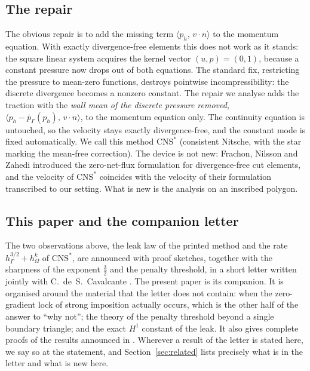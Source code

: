 \documentclass[pdflatex,sn-mathphys-num]{sn-jnl}
\theoremstyle{thmstyleone}
\theoremstyle{thmstylethree}
\newcommand{\hG}{h_\Gamma}
\newcommand{\hO}{h_\Omega}
\newcommand{\pbG}{\bar p_{\Gamma}}
\newcommand{\ip}[2]{\langle #1,\, #2\rangle}
\newcommand{\CNS}{\mathrm{CNS}^\ast}
\begin{document}
\subsection{The repair}
The obvious repair is to add the missing term $\ip{p_h}{v\cdot n}$ to the momentum equation. With exactly divergence-free elements this does not work as it stands: the square linear system acquires the kernel vector $(u,p)=(0,1)$, because a constant pressure now drops out of both equations. The standard fix, restricting the pressure to mean-zero functions, destroys pointwise incompressibility: the discrete divergence becomes a nonzero constant. The repair we analyse adds the traction with the \emph{wall mean of the discrete pressure removed}, $\ip{p_h-\pbG(p_h)}{v\cdot n}$, to the momentum equation only. The continuity equation is untouched, so the velocity stays exactly divergence-free, and the constant mode is fixed automatically. We call this method $\CNS$ (consistent Nitsche, with the star marking the mean-free correction). The device is not new: Frachon, Nilsson and Zahedi \cite{FrachonNilssonZahedi2024} introduced the zero-net-flux formulation for divergence-free cut elements, and the velocity of $\CNS$ coincides with the velocity of their formulation transcribed to our setting. What is new is the analysis on an inscribed polygon.

\subsection{This paper and the companion letter}\label{sec:companion}
The two observations above, the leak law of the printed method and the rate $\hG^{3/2}+\hO^k$ of $\CNS$, are announced with proof sketches, together with the sharpness of the exponent $\frac32$ and the penalty threshold, in a short letter written jointly with C.~de~S.~Cavalcante \cite{CavalcantePadhiLetter}. The present paper is its companion. It is organised around the material that the letter does not contain: when the zero-gradient lock of strong imposition actually occurs, which is the other half of the answer to ``why not''; the theory of the penalty threshold beyond a single boundary triangle; and the exact $H^1$ constant of the leak. It also gives complete proofs of the results announced in \cite{CavalcantePadhiLetter}. Wherever a result of the letter is stated here, we say so at the statement, and Section~\ref{sec:related} lists precisely what is in the letter and what is new here.
\end{document}
